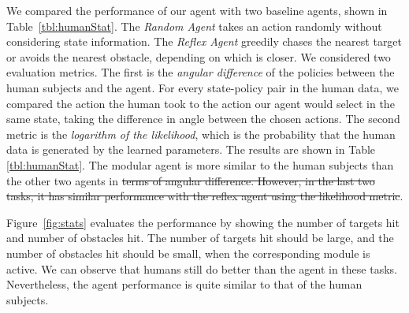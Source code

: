 \documentclass[12pt]{report}	%
\theoremstyle{definition}
\theoremstyle{remark}
\providecommand{\DIFadd}[1]{{\protect\color{blue}\uwave{#1}}} %
\providecommand{\DIFdel}[1]{{\protect\color{red}\sout{#1}}}                      %
\providecommand{\DIFaddbegin}{} %
\providecommand{\DIFaddend}{} %
\providecommand{\DIFdelbegin}{} %
\providecommand{\DIFdelend}{} %
\begin{document}
We compared the performance of our agent with two baseline agents, shown in
Table~\ref{tbl:humanStat}. The {\em Random Agent} takes an action randomly
without considering state information. The {\em Reflex Agent} greedily chases the nearest target or avoids the nearest obstacle, depending on which is closer. We considered two evaluation metrics. The first is the {\em angular difference} of
the policies between the human subjects and the
agent. For every state-policy pair in the human data, we
compared the action the human took to the action our agent would select in the same state, taking the difference in angle between the chosen actions. The second metric is the {\em logarithm of the likelihood}, which is the
\DIFaddbegin \DIFadd{logarithm of the }\DIFaddend probability that the human data is generated by the learned
parameters. The results are shown in Table \ref{tbl:humanStat}. The modular
agent is more similar to the human subjects than the other two agents in \DIFdelbegin \DIFdel{terms of angular difference. However, in the last two tasks, it has similar performance with the reflex agent using the likelihood metric}\DIFdelend \DIFaddbegin \DIFadd{both
metrics}\DIFaddend .

Figure~\ref{fig:stats} evaluates the performance by showing the number of
targets hit and number of obstacles hit.  The number of targets hit should be
large, and the number of obstacles hit should be small, when the corresponding
module is active.  We can observe that humans still do better than the agent in
these tasks.  Nevertheless, the agent performance is quite similar to that of
the human subjects.
\end{document}
